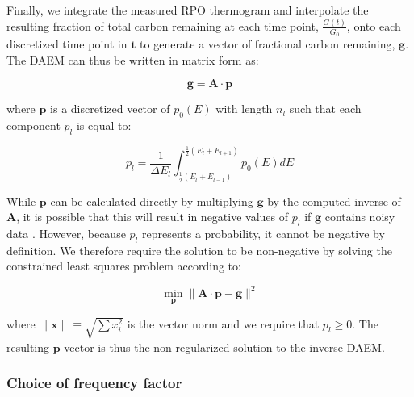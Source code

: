 Finally, we integrate the measured RPO thermogram and interpolate the resulting fraction of total carbon remaining at each time point, $\frac{G(t)}{G_{0}}$, onto each discretized time point in $\mathbf{t}$ to generate a vector of fractional carbon remaining, $\mathbf{g}$. The DAEM can thus be written in matrix form as:

\begin{equation}\label{Ch3Eq:18}
	\mathbf{g} = \mathbf{A} \cdot \mathbf{p}
\end{equation}

where $\mathbf{p}$ is a discretized vector of $p_{0}(E)$ with length $n_{l}$ such that each component $p_{l}$ is equal to:

\begin{equation}\label{Ch3Eq:19}
	p_{l} = \frac{1}{\Delta E_{l}} \int_{ \frac{1}{2} \left(E_{l} + E_{l-1} \right)}^{\frac{1}{2} \left(E_{l} + E_{l+1} \right)} p_{0}(E) dE
\end{equation}

While $\mathbf{p}$ can be calculated directly by multiplying $\mathbf{g}$ by the computed inverse of $\mathbf{A}$, it is possible that this will result in negative values of $p_{l}$ if $\mathbf{g}$ contains noisy data \citep{Forney:2012hz}. However, because $p_{l}$ represents a probability, it cannot be negative by definition. We therefore require the solution to be non-negative by solving the constrained least squares problem according to:

\begin{equation}\label{Ch3Eq:20}
	\min_{\mathbf{p}} \| \mathbf{A} \cdot \mathbf{p} - \mathbf{g} \|^{2}
\end{equation}

where $\| \mathbf{x} \| \equiv \sqrt{ \sum x_{i}^{2}}$ is the vector norm and we require that $p_{l} \geq 0$. The resulting $\mathbf{p}$ vector is thus the non-regularized solution to the inverse DAEM.

\subsubsection{Choice of frequency factor}

